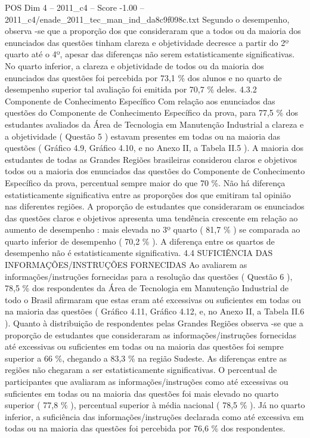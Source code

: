 \begin{textsample}{POS Dim 4 – 2011\_c4 – Score -1.00 – 2011\_c4/enade\_2011\_tec\_man\_ind\_da8c9f098c.txt}
Segundo o desempenho, observa -se que a proporção dos que consideraram que a todos ou da maioria dos enunciados das questões tinham clareza e objetividade decresce a partir do 2º quarto até o 4º, apesar das diferenças não serem estatisticamente significativas.
No quarto inferior, a clareza e objetividade de todos ou da maioria dos enunciados das questões foi percebida por 73,1 \% dos alunos e no quarto de desempenho superior tal avaliação foi emitida por 70,7 \% deles. 4.3.2 Componente de Conhecimento Específico Com relação aos enunciados das questões do Componente de Conhecimento Específico da prova, para 77,5 \% dos estudantes avaliados da Área de Tecnologia em Manutenção Industrial a clareza e a objetividade ( Questão 5 ) estavam presentes em todas ou na maioria das questões ( Gráfico 4.9, Gráfico 4.10, e no Anexo II, a Tabela II.5 ).
A maioria dos estudantes de todas as Grandes Regiões brasileiras considerou claros e objetivos todos ou a maioria dos enunciados das questões do Componente de Conhecimento Específico da prova, percentual sempre maior do que 70 \%.
Não há diferença estatisticamente significativa entre as proporções dos que emitiram tal opinião nas diferentes regiões.
A proporção de estudantes que consideraram os enunciados das questões claros e objetivos apresenta uma tendência crescente em relação ao aumento de desempenho : mais elevada no 3º quarto ( 81,7 \% ) se comparada ao quarto inferior de desempenho ( 70,2 \% ).
A diferença entre os quartos de desempenho não é estatisticamente significativa. 4.4 SUFICIÊNCIA DAS INFORMAÇÕES/INSTRUÇÕES FORNECIDAS Ao avaliarem as informações/instruções fornecidas para a resolução das questões ( Questão 6 ), 78,5 \% dos respondentes da Área de Tecnologia em Manutenção Industrial de todo o Brasil afirmaram que estas eram até excessivas ou suficientes em todas ou na maioria das questões ( Gráfico 4.11, Gráfico 4.12, e, no Anexo II, a Tabela II.6 ).
Quanto à distribuição de respondentes pelas Grandes Regiões observa -se que a proporção de estudantes que consideraram as informações/instruções fornecidas até excessivas ou suficientes em todas ou na maioria das questões foi sempre superior a 66 \%, chegando a 83,3 \% na região Sudeste.
As diferenças entre as regiões não chegaram a ser estatisticamente significativas.
O percentual de participantes que avaliaram as informações/instruções como até excessivas ou suficientes em todas ou na maioria das questões foi mais elevado no quarto superior ( 77,8 \% ), percentual superior à média nacional ( 78,5 \% ).
Já no quarto inferior, a suficiência das informações/instruções declarada como até excessiva em todas ou na maioria das questões foi percebida por 76,6 \% dos respondentes.

\end{textsample}
